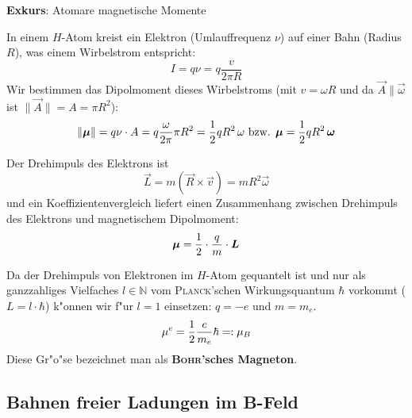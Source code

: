 \begin{Beispiel}
\textbf{Exkurs}: Atomare magnetische Momente

In einem $H$-Atom kreist ein Elektron (Umlauffrequenz $\nu$) auf einer
Bahn (Radius $R$), was einem Wirbelstrom entspricht:
\begin{equation*}
   I = q \nu = q \frac{v}{2\pi R}
\end{equation*}
Wir bestimmen das Dipolmoment dieses Wirbelstroms (mit $v = \omega R$
und da $\vec A \| \vec \omega$ ist $\|\vec A\| = A = \pi R^2$):
\begin{equation*}
    \| \boldsymbol{\mu}\| = q \nu \cdot A = q \frac{\omega}{2\pi} \pi R^2 =
    \frac{1}{2}q R^2 \, \omega \text{ bzw. } \boldsymbol{\mu} =   \frac{1}{2}q R^2 \, \boldsymbol{\omega}
\end{equation*}

Der Drehimpuls des Elektrons ist
$$\vec L = m (\vec R \times \vec v ) = mR^2
\vec \omega$$
und ein Koeffizientenvergleich liefert einen Zusammenhang zwischen
Drehimpuls des Elektrons und magnetischem Dipolmoment:
\begin{equation}
   \label{eq:376}
   \boldsymbol{\mu} = \frac{1}{2} \cdot \frac{q}{m} \cdot \boldsymbol{L}
\end{equation}


Da der Drehimpuls von Elektronen im $H$-Atom
gequantelt ist und nur als ganzzahliges Vielfaches
$l \in \mathbb N$ vom \textsc{Planck}'schen Wirkungsquantum $\hbar$
vorkommt ($L = l \cdot \hbar$) k"onnen wir f"ur $l = 1$ einsetzen: $q
= -e$ und $m = m_e$.
\begin{equation}
   \label{eq:377}
   \mu^e = \frac{1}{2} \frac{e}{m_e} \hbar =: \mu_B
\end{equation}
Diese Gr"o"se bezeichnet man als \textbf{\textsc{Bohr}'sches Magneton}.
\end{Beispiel}








\subsection{Bahnen freier Ladungen im B-Feld}
\label{kap_bahnen-freier-ladungen-im-b}

